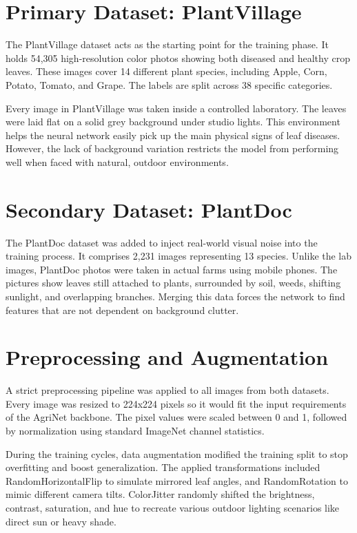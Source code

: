 \documentclass[12pt, a4paper]{report}
\begin{document}
\section{Primary Dataset: PlantVillage}
The PlantVillage dataset acts as the starting point for the training phase. It holds 54,305 high-resolution color photos showing both diseased and healthy crop leaves. These images cover 14 different plant species, including Apple, Corn, Potato, Tomato, and Grape. The labels are split across 38 specific categories. 

Every image in PlantVillage was taken inside a controlled laboratory. The leaves were laid flat on a solid grey background under studio lights. This environment helps the neural network easily pick up the main physical signs of leaf diseases. However, the lack of background variation restricts the model from performing well when faced with natural, outdoor environments.

\section{Secondary Dataset: PlantDoc}
The PlantDoc dataset was added to inject real-world visual noise into the training process. It comprises 2,231 images representing 13 species. Unlike the lab images, PlantDoc photos were taken in actual farms using mobile phones. The pictures show leaves still attached to plants, surrounded by soil, weeds, shifting sunlight, and overlapping branches. Merging this data forces the network to find features that are not dependent on background clutter.

\section{Preprocessing and Augmentation}
A strict preprocessing pipeline was applied to all images from both datasets. Every image was resized to 224x224 pixels so it would fit the input requirements of the AgriNet backbone. The pixel values were scaled between 0 and 1, followed by normalization using standard ImageNet channel statistics. 

During the training cycles, data augmentation modified the training split to stop overfitting and boost generalization. The applied transformations included RandomHorizontalFlip to simulate mirrored leaf angles, and RandomRotation to mimic different camera tilts. ColorJitter randomly shifted the brightness, contrast, saturation, and hue to recreate various outdoor lighting scenarios like direct sun or heavy shade.
\end{document}
